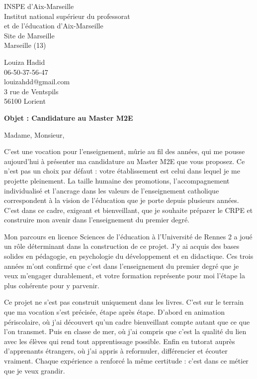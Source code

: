 \documentclass[12pt,a4paper]{letter}
\begin{document}
\begin{letter}{INSPE d'Aix-Marseille\\
Institut national supérieur du professorat\\
et de l'éducation d'Aix-Marseille\\
Site de Marseille\\
Marseille (13)}

\hspace{-2cm}
\begin{minipage}{0.45\textwidth}
Louiza Hadid\\
06-50-37-56-47\\
louizahdd@gmail.com\\
3 rue de Ventspils\\
56100 Lorient
\end{minipage}

\vspace{1cm}

\textbf{Objet : Candidature au Master M2E}

\opening{Madame, Monsieur,}

\hspace{1cm} C'est une vocation pour l'enseignement, mûrie au fil des années, qui me pousse aujourd'hui à présenter ma candidature au Master M2E que vous proposez. Ce n'est pas un choix par défaut : votre établissement est celui dans lequel je me projette pleinement. La taille humaine des promotions, l'accompagnement individualisé et l'ancrage dans les valeurs de l'enseignement catholique correspondent à la vision de l'éducation que je porte depuis plusieurs années. C'est dans ce cadre, exigeant et bienveillant, que je souhaite préparer le CRPE et construire mon avenir dans l'enseignement du premier degré.

\hspace{1cm} Mon parcours en licence Sciences de l'éducation à l'Université de Rennes 2 a joué un rôle déterminant dans la construction de ce projet. J'y ai acquis des bases solides en pédagogie, en psychologie du développement et en didactique. Ces trois années m'ont confirmé que c'est dans l'enseignement du premier degré que je veux m'engager durablement, et votre formation représente pour moi l'étape la plus cohérente pour y parvenir.

\hspace{1cm} Ce projet ne s'est pas construit uniquement dans les livres. C'est sur le terrain que ma vocation s'est précisée, étape après étape. D'abord en animation périscolaire, où j'ai découvert qu'un cadre bienveillant compte autant que ce que l'on transmet. Puis en classe de mer, où j'ai compris que c'est la qualité du lien avec les élèves qui rend tout apprentissage possible. Enfin en tutorat auprès d'apprenants étrangers, où j'ai appris à reformuler, différencier et écouter vraiment. Chaque expérience a renforcé la même certitude : c'est dans ce métier que je veux grandir.


\end{letter}
\end{document}
